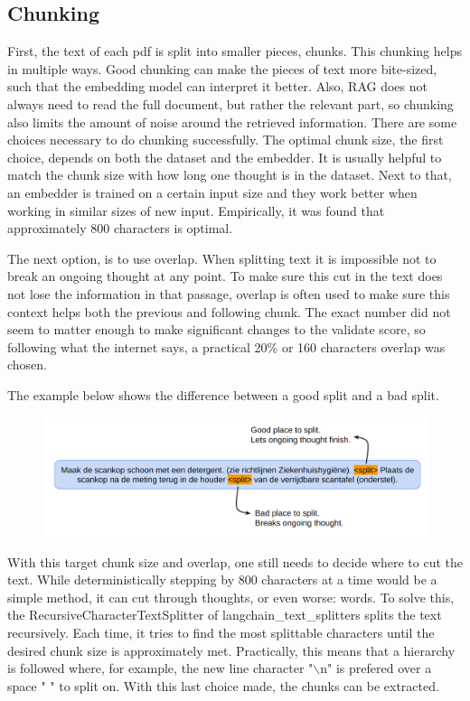 \subsection{Chunking}
First, the text of each pdf is split into smaller pieces, chunks. This chunking helps in multiple ways. Good chunking can make the pieces of text more bite-sized, such that the embedding model can interpret it better. Also, RAG does not always need to read the full document, but rather the relevant part, so chunking also limits the amount of noise around the retrieved information. There are some choices necessary to do chunking successfully. The optimal chunk size, the first choice, depends on both the dataset and the embedder. It is usually helpful to match the chunk size with how long one thought is in the dataset. Next to that, an embedder is trained on a certain input size and they work better when working in similar sizes of new input. Empirically, it was found that approximately 800 characters is optimal. 

The next option, is to use overlap. When splitting text it is impossible not to break an ongoing thought at any point. To make sure this cut in the text does not lose the information in that passage, overlap is often used to make sure this context helps both the previous and following chunk. The exact number did not seem to matter enough to make significant changes to the validate score, so following what the internet says, a practical 20\% or 160 characters overlap was chosen.

The example below shows the difference between a good split and a bad split.

\begin{figure}[H]
    \captionsetup{justification=centering}
    \centerline{\includegraphics[width=1\linewidth]{fig/good_split_bad_split.png}}
\end{figure}

With this target chunk size and overlap, one still needs to decide where to cut the text. While deterministically stepping by 800 characters at a time would be a simple method, it can cut through thoughts, or even worse: words. To solve this, the RecursiveCharacterTextSplitter of langchain\_text\_splitters splits the text recursively. Each time, it tries to find the most splittable characters until the desired chunk size is approximately met. Practically, this means that a hierarchy is followed where, for example, the new line character "$\backslash$n" is prefered over a space " " to split on. With this last choice made, the chunks can be extracted.

